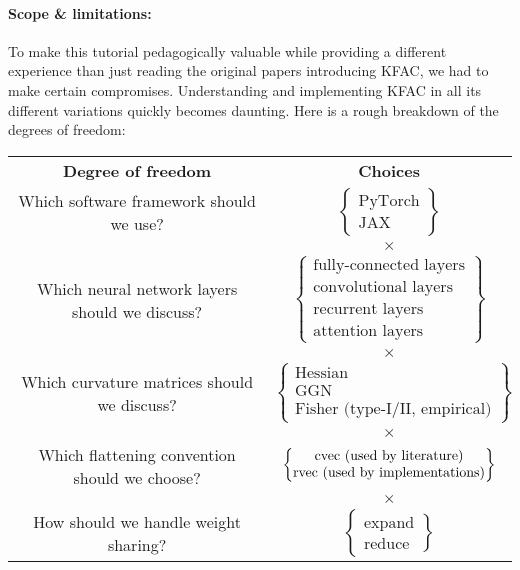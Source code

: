 \paragraph{Scope \& limitations:} To make this tutorial pedagogically valuable while providing a different experience than just reading the original papers introducing KFAC, we had to make certain compromises.
Understanding and implementing KFAC in all its different variations quickly becomes daunting.
Here is a rough breakdown of the degrees of freedom:
\begin{center}

  \begin{tabular}[!h]{cc}
    \textbf{Degree of freedom}
    &
      \textbf{Choices}
    \\
    Which software framework should we use?
    &
      $
      \begin{Bmatrix}
        \text{PyTorch}
        \\
        \text{JAX}
      \end{Bmatrix}
      $
    \\
    & $\times$
    \\
    Which neural network layers should we discuss?
    &
      $
      \begin{Bmatrix}
        \text{fully-connected layers}
        \\
        \text{convolutional layers}
        \\
        \text{recurrent layers}
        \\
        \text{attention layers}
      \end{Bmatrix}
      $
    \\
    & $\times$
    \\
    Which curvature matrices should we discuss?
    &
      $
      \begin{Bmatrix}
        \text{Hessian}
        \\
        \text{GGN}
        \\
        \text{Fisher (type-I/II, empirical)}
      \end{Bmatrix}
      $
    \\
    & $\times$
    \\
    Which flattening convention should we choose?
    &
      $
      \begin{Bmatrix}
        \operatorname{cvec}\,\text{(used by literature)}
        \\
        \operatorname{rvec}\,\text{(used by implementations)}
      \end{Bmatrix}
      $
    \\
    & $\times$
    \\
    How should we handle weight sharing?
    &
      $
      \begin{Bmatrix}
        \text{expand}
        \\
        \text{reduce}
      \end{Bmatrix}
      $
  \end{tabular}
\end{center}
